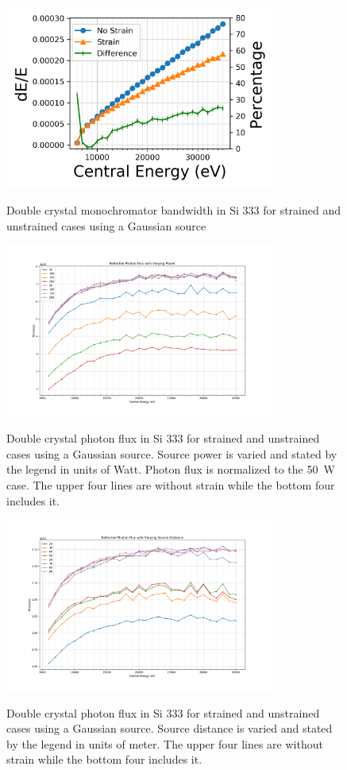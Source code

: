 \documentclass[preprint]{iucr}              %
\begin{document}
\begin{figure}
\caption{Double crystal monochromator bandwidth in Si 333 for strained and unstrained cases using a Gaussian source}
\includegraphics[width = 8.85cm]{images/333monobw.png}
\label{fig:333monobw}
\end{figure}

\begin{figure}
\caption{Double crystal photon flux in Si 333 for strained and unstrained cases using a Gaussian source. Source power is varied and stated by the legend in units of Watt. Photon flux is normalized to the 50~W case. The upper four lines are without strain while the bottom four includes it.}
\includegraphics[width = 8.85cm]{images/333strainpower.png}
\label{fig:333strainpower}
\end{figure}


\begin{figure}
\caption{Double crystal photon flux in Si 333 for strained and unstrained cases using a Gaussian source. Source distance is varied and stated by the legend in units of meter. The upper four lines are without strain while the bottom four includes it.}
\includegraphics[width = 8.85cm]{images/333straindistance.png}
\label{fig:333straindistance}
\end{figure}
\end{document}
